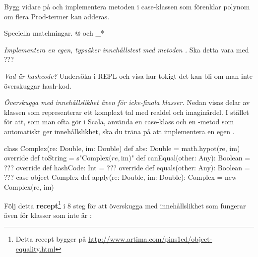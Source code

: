 \AdvancedTasks %

\Subtask Bygg vidare på  och implementera metoden  i case-klassen  som förenklar polynom om flera Prod-termer kan adderas.

\Task \TODO Speciella matchningar.  @ och \_*

\Task \TODO \emph{Implementera en egen, typsäker innehållstest med metoden \code{===}.} Ska detta vara med ???

\Task \emph{Vad är hashcode?} \TODO Undersöka \code{##} i REPL och visa hur tokigt det kan bli om man inte överskuggar hash-kod.

\Task \label{task:equals:Complex} \emph{Överskugga  med innehållslikhet även för icke-finala klasser.} Nedan visas delar av klassen  som representerar ett komplext tal med realdel och imaginärdel. I stället för att, som man ofta gör i Scala, använda en case-klass och en -metod som automatiskt ger innehållslikhet, ska du träna på att implementera en egen . 
\begin{Code}
class Complex(re: Double, im: Double) {
  def abs: Double = math.hypot(re, im)
  override def toString = s"Complex($re, $im)"
  def canEqual(other: Any): Boolean = ???
  override def hashCode: Int  = ??? 
  override def equals(other: Any): Boolean = ???
}
case object Complex {
  def apply(re: Double, im: Double): Complex = new Complex(re, im)
}
\end{Code}
Följ detta \textbf{recept}\footnote{Detta recept bygger på \url{http://www.artima.com/pins1ed/object-equality.html}} i 8 steg för att överskugga  med innehållslikhet som fungerar även för klasser som inte är :

